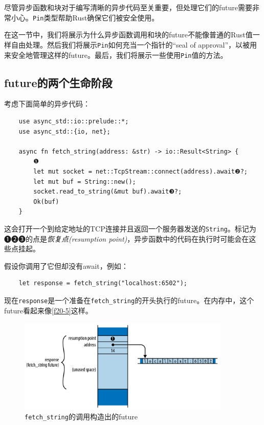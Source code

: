 尽管异步函数和块对于编写清晰的异步代码至关重要，但处理它们的future需要非常小心。\texttt{Pin}类型帮助Rust确保它们被安全使用。

在这一节中，我们将展示为什么异步函数调用和块的future不能像普通的Rust值一样自由处理。然后我们将展示\texttt{Pin}如何充当一个指针的“seal of approval”，以被用来安全地管理这样的future。最后，我们将展示一些使用\texttt{Pin}值的方法。

\subsection{future的两个生命阶段}
考虑下面简单的异步代码：
\begin{verbatim}
    use async_std::io::prelude::*;
    use async_std::{io, net};

    async fn fetch_string(address: &str) -> io::Result<String> {
        ❶
        let mut socket = net::TcpStream::connect(address).await❷?;
        let mut buf = String::new();
        socket.read_to_string(&mut buf).await❸?;
        Ok(buf)
    }
\end{verbatim}

这会打开一个到给定地址的TCP连接并且返回一个服务器发送的\texttt{String}。标记为❶❷❸的点是\emph{恢复点(resumption point)}，异步函数中的代码在执行时可能会在这些点挂起。

假设你调用了它但却没有await，例如：
\begin{verbatim}
    let response = fetch_string("localhost:6502");
\end{verbatim}

现在\texttt{response}是一个准备在\texttt{fetch\_string}的开头执行的future。在内存中，这个future看起来像\autoref{f20-5}这样。

\begin{figure}
    \centering
    \includegraphics[width=0.9\textwidth]{../img/f20-5.png}
    \caption{\texttt{fetch\_string}的调用构造出的future}
    \label{f20-5}
\end{figure}

